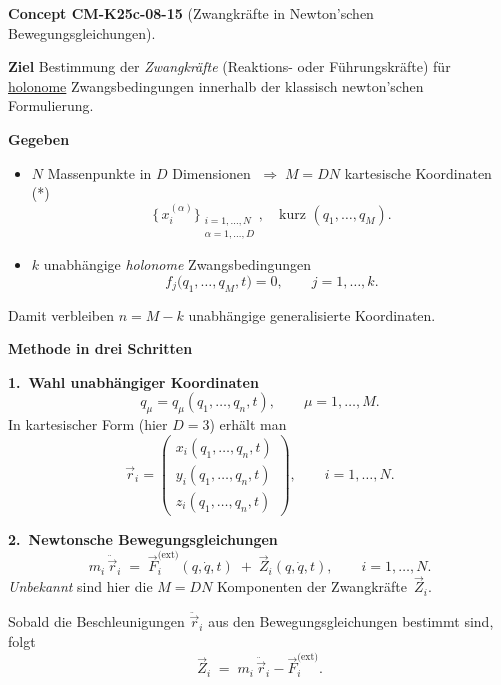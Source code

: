 \documentclass[10pt, letterpaper]{article}
\newcommand{\CustomHeading}[3]{%
  \par\medskip\noindent%
  \textbf{#1 #2} \textnormal{(#3)}.\enskip%
}
\newenvironment{CONC}[2]{\CustomHeading{Concept}{#1}{#2}}{}
\begin{document}
\begin{CONC}{CM-K25c-08-15}{Zwangkräfte in Newton'schen Bewegungsgleichungen}
\textbf*{Ziel}
Bestimmung der \emph{Zwangkräfte} (Reaktions- oder Führungskräfte) 
für \underline{holonome} Zwangsbedingungen innerhalb der klassisch
newton’schen Formulierung.

\textbf*{Gegeben}
\begin{itemize}
  \item $N$ Massenpunkte in $D$ Dimensionen $\;\Longrightarrow\; M=DN$
        kartesische Koordinaten\,(*)  
        \[
          \bigl\{\,x_{i}^{(\alpha)}\bigr\}_{\substack{i=1,\dots,N\\\alpha=1,\dots,D}},
          \quad
          \text{kurz } 
          (q_1,\dots,q_M).
        \]
  \item $k$ unabhängige \emph{holonome} Zwangsbedingungen
        \[
          f_j\bigl(q_1,\dots,q_M,t\bigr)=0,
          \qquad j=1,\dots,k .
        \]
\end{itemize}
Damit verbleiben $n=M-k$ unabhängige generalisierte Koordinaten.

\textbf*{Methode in drei Schritten}

\textbf{1.\ Wahl unabhängiger Koordinaten}
\[
  q_\mu = q_\mu(q_1,\dots,q_n,t), 
  \qquad \mu = 1,\dots,M .
\]
In kartesischer Form (hier $D=3$) erhält man
\[
  \vec r_i = 
  \begin{pmatrix}
    x_i(q_1,\dots,q_n,t)\\[2pt]
    y_i(q_1,\dots,q_n,t)\\[2pt]
    z_i(q_1,\dots,q_n,t)
  \end{pmatrix},
  \qquad
  i=1,\dots,N .
\]

\textbf{2.\ Newtonsche Bewegungsgleichungen}
\[
  m_i\,\ddot{\vec r}_i
  \;=\;
  \vec F_i^{\text{(ext)}}(q,\dot q,t)
  \;+\;
  \vec Z_i(q,\dot q,t),
  \qquad i=1,\dots,N .
\]
\emph{Unbekannt} sind hier die $M=DN$ Komponenten der
Zwangkräfte~$\vec Z_i$.

Sobald die Beschleunigungen $\ddot{\vec r}_i$
aus den Bewegungsgleichungen bestimmt sind, folgt
\[
  \vec Z_i 
  \;=\;
  m_i\,\ddot{\vec r}_i - \vec F_i^{\text{(ext)}} .
\]


\end{CONC}
\end{document}
